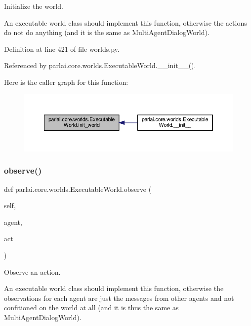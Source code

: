 \begin{DoxyVerb}Initialize the world.

An executable world class should implement this function, otherwise
the actions do not do anything (and it is the same as MultiAgentDialogWorld).
\end{DoxyVerb}
 

Definition at line 421 of file worlds.\+py.



Referenced by parlai.\+core.\+worlds.\+Executable\+World.\+\_\+\+\_\+init\+\_\+\+\_\+().

Here is the caller graph for this function\+:
\nopagebreak
\begin{figure}[H]
\begin{center}
\leavevmode
\includegraphics[width=350pt]{classparlai_1_1core_1_1worlds_1_1ExecutableWorld_a8bb31ec1d93a94cb261f89ce0992159a_icgraph}
\end{center}
\end{figure}
\mbox{\label{classparlai_1_1core_1_1worlds_1_1ExecutableWorld_a69934ec2181a8b22269e02ab8b3bb1f2}} 
\subsubsection{\texorpdfstring{observe()}{observe()}}
{\footnotesize\ttfamily def parlai.\+core.\+worlds.\+Executable\+World.\+observe (\begin{DoxyParamCaption}\item[{}]{self,  }\item[{}]{agent,  }\item[{}]{act }\end{DoxyParamCaption})}

\begin{DoxyVerb}Observe an action.

An executable world class should implement this function, otherwise
the observations for each agent are just the messages from other agents
and not confitioned on the world at all (and it is thus the same as
MultiAgentDialogWorld).
\end{DoxyVerb}
 

